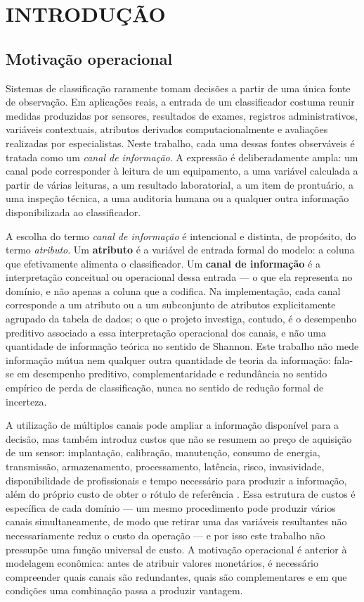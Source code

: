 \chapter{INTRODUÇÃO}

\section{Motivação operacional}

Sistemas de classificação raramente tomam decisões a partir de uma única fonte de observação. Em aplicações reais, a entrada de um classificador costuma reunir medidas produzidas por sensores, resultados de exames, registros administrativos, variáveis contextuais, atributos derivados computacionalmente e avaliações realizadas por especialistas. Neste trabalho, cada uma dessas fontes observáveis é tratada como um \emph{canal de informação}. A expressão é deliberadamente ampla: um canal pode corresponder à leitura de um equipamento, a uma variável calculada a partir de várias leituras, a um resultado laboratorial, a um item de prontuário, a uma inspeção técnica, a uma auditoria humana ou a qualquer outra informação disponibilizada ao classificador.

A escolha do termo \emph{canal de informação} é intencional e distinta, de propósito, do termo \emph{atributo}. Um \textbf{atributo} é a variável de entrada formal do modelo: a coluna que efetivamente alimenta o classificador. Um \textbf{canal de informação} é a interpretação conceitual ou operacional dessa entrada --- o que ela representa no domínio, e não apenas a coluna que a codifica. Na implementação, cada canal corresponde a um atributo ou a um subconjunto de atributos explicitamente agrupado da tabela de dados; o que o projeto investiga, contudo, é o desempenho preditivo associado a essa interpretação operacional dos canais, e não uma quantidade de informação teórica no sentido de Shannon. Este trabalho não mede informação mútua nem qualquer outra quantidade de teoria da informação: fala-se em desempenho preditivo, complementaridade e redundância no sentido empírico de perda de classificação, nunca no sentido de redução formal de incerteza.

A utilização de múltiplos canais pode ampliar a informação disponível para a decisão, mas também introduz custos que não se resumem ao preço de aquisição de um sensor: implantação, calibração, manutenção, consumo de energia, transmissão, armazenamento, processamento, latência, risco, invasividade, disponibilidade de profissionais e tempo necessário para produzir a informação, além do próprio custo de obter o rótulo de referência \cite{turney2002}. Essa estrutura de custos é específica de cada domínio --- um mesmo procedimento pode produzir vários canais simultaneamente, de modo que retirar uma das variáveis resultantes não necessariamente reduz o custo da operação --- e por isso este trabalho não pressupõe uma função universal de custo. A motivação operacional é anterior à modelagem econômica: antes de atribuir valores monetários, é necessário compreender quais canais são redundantes, quais são complementares e em que condições uma combinação passa a produzir vantagem.

